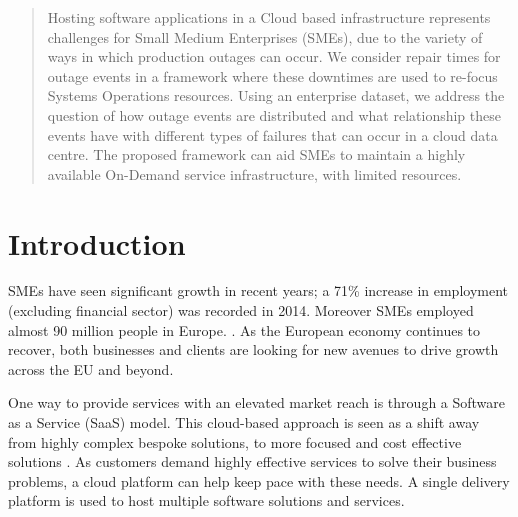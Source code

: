\documentclass[conference]{IEEEtran}
\begin{document}
\begin{abstract}

Hosting software applications in a Cloud based infrastructure represents challenges for Small Medium Enterprises (SMEs), due to the variety of ways in which production outages can occur. We consider repair times for outage events in a framework where these downtimes are used to re-focus Systems Operations resources. Using an enterprise dataset, we address the question of how outage events are distributed and what relationship these events have with different types of failures that can occur in a cloud data centre. The proposed framework can aid SMEs to maintain a highly available On-Demand service infrastructure, with limited resources.
\end{abstract}


%
\IEEEpeerreviewmaketitle

\section{Introduction}

SMEs have seen significant growth in recent years; a 71\% increase in employment (excluding financial sector) was recorded in 2014. Moreover SMEs employed almost 90 million people in Europe. \cite{europa2015sme}. As the European economy continues to recover, both businesses and clients are looking for new avenues to drive growth across the EU and beyond. \par

One way to provide services with an elevated market reach is through a Software as a Service (SaaS) model. This cloud-based approach is seen as a shift away from highly complex bespoke solutions, to more focused and cost effective solutions \cite{cloudbook2015}. As customers demand highly effective services to solve their business problems, a cloud platform can help keep pace with these needs. A single delivery platform is used to host multiple software solutions and services. \par
\end{document}
